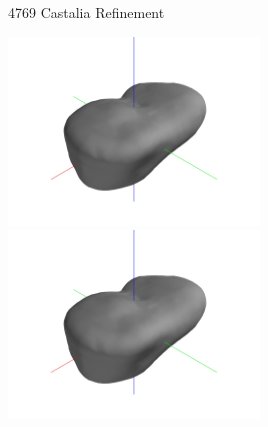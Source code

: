 \begin{frame}{4769 Castalia Refinement}

\begin{center}
    \href{https://youtu.be/pS8vLuRZGxE}{\includegraphics[trim={20cm 10cm 20cm 10cm},clip,keepaspectratio,width=0.5\textwidth,height=\textheight]{figures/computational_geometry/dynamic_exploration/castalia/partial_14998.jpg}}%
    \href{https://youtu.be/5ETsFOXQeOs}{\includegraphics[trim={20cm 10cm 20cm 10cm},clip,keepaspectratio,width=0.5\textwidth,height=\textheight]{figures/computational_geometry/dynamic_exploration/castalia/partial_14998.jpg}}
\end{center}

\end{frame}


